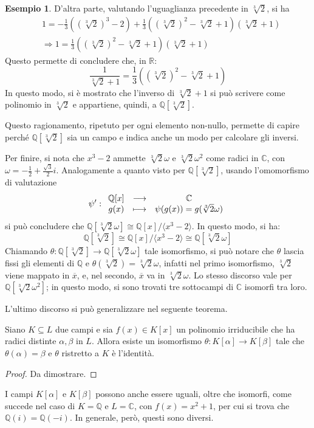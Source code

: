 \documentclass[11pt, a4paper]{scrartcl}
\theoremstyle{definition}
\newtheorem{esempio}{Esempio}
\numberwithin{esempio}{section}
\theoremstyle{definition}
\numberwithin{obs}{section}
\numberwithin{nota}{section}
\numberwithin{equation}{subsection}
\begin{document}
\begin{esempio}
	D'altra parte, valutando l'uguaglianza precedente in $\sqrt[3]{2} $, si ha
	\[
	\begin{split}
		&1 = -\frac{1}{3}\left((\sqrt[3]{2} )^3 -2\right)  + \frac{1}{3}\left((\sqrt[3]{2} )^2 - \sqrt[3]{2} +1\right) \left(\sqrt[3]{2} +1\right) \\
		&\Rightarrow 1 = \frac{1}{3} \left((\sqrt[3]{2} )^2 - \sqrt[3]{2} +1\right) \left(\sqrt[3]{2} +1\right) 
	\end{split}
	\] 
Questo permette di concludere che, in $\mathbb{R}$:
\[
	\frac{1}{\sqrt[3]{2} +1} = \frac{1}{3} \left((\sqrt[3]{2} )^2 - \sqrt[3]{2} +1\right) 
\] 
In questo modo, si \`e mostrato che l'inverso di $\sqrt[3]{2} +1$ si pu\`o scrivere come polinomio in $\sqrt[3]{2} $ e appartiene, quindi, a $\mathbb{Q}[\sqrt[3]{2} ]$.

Questo ragionamento, ripetuto per ogni elemento non-nullo, permette di capire perch\'e $\mathbb{Q}[\sqrt[3]{2} ]$ sia un campo e indica anche un modo per calcolare gli inversi.

Per finire, si nota che $x^3 -2 $ ammette $\sqrt[3]{2}\omega $ e $\sqrt[3]{2} \omega^2$ come radici in $\mathbb{C}$, con $\omega = -\frac{1}{2} + \frac{\sqrt{3} }{2}i$.
Analogamente a quanto visto per $\mathbb{Q}[\sqrt[3]{2} ]$, usando l'omomorfismo di valutazione 
\[
\psi ' :
\begin{array}{c c c}
	\mathbb{Q}[x]& \longrightarrow& \mathbb{C}\\
	g(x) & \longmapsto & \psi (g(x)) = g (\sqrt[3]{2} \omega)
\end{array}
\] 
si pu\`o concludere che $\mathbb{Q}[\sqrt[3]{2} \omega]\cong \mathbb{Q}[x] / \langle x^3 - 2 \rangle$.
In questo modo, si ha:
\[
	\mathbb{Q}[\sqrt[3]{2} ] \cong \mathbb{Q}[x] / \langle x^3 - 2 \rangle\cong \mathbb{Q}[\sqrt[3]{2} \omega]
\] 
Chiamando $\theta : \mathbb{Q}[\sqrt[3]{2} ]\to \mathbb{Q}[\sqrt[3]{2} \omega]$ tale isomorfismo, si pu\`o notare che $\theta $ lascia fissi gli elementi di $\mathbb{Q}$ e $\theta (\sqrt[3]{2} ) = \sqrt[3]{2}\omega $, infatti nel primo isomorfismo, $\sqrt[3]{2} $ viene mappato in $\overline{x}$, e, nel secondo, $\overline{x}$ va in $\sqrt[3]{2}\omega $.
Lo stesso discorso vale per $\mathbb{Q}[\sqrt[3]{2} \omega^2]$; in questo modo, si sono trovati tre sottocampi di $\mathbb{C}$ isomorfi tra loro.
\end{esempio}
\noindent L'ultimo discorso si pu\`o generalizzare nel seguente teorema.
\begin{teorema}
	{}{}
	Siano $K \subseteq L$ due campi e sia $f(x) \in K[x]$ un polinomio irriducibile che ha radici distinte $\alpha ,\beta $ in $L$.
	Allora esiste un isomorfismo $\theta  : K[\alpha ] \to K[\beta ]$ tale che $\theta (\alpha ) = \beta $ e $\theta $ ristretto a $K$ \`e l'identit\`a.
	\begin{proof}
		{\color{red} Da dimostrare.}
	\end{proof}
\end{teorema}
\noindent I campi $K[\alpha]$ e $K[\beta ]$ possono anche essere uguali, oltre che isomorfi, come succede nel caso di $K = \mathbb{Q}$ e $L = \mathbb{C}$, con $f(x) = x^2 +1$, per cui si trova che $\mathbb{Q}(i) = \mathbb{Q}(-i)$.
In generale, per\`o, questi sono diversi.
\end{document}
